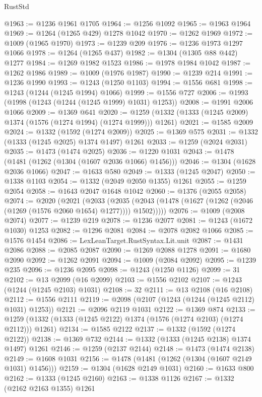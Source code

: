 \begin{lexlean}{RustStd}
\begin{coremodule}
@1963 := @1236 @1961 @1705
@1964 := @1256 @1092
@1965 := @1963 @1964
@1969 := @1264 (@1265 @429) @1278 @1042
@1970 := @1262 @1969
@1972 := @1009 (@1965 @1970)
@1973 := @1239 @209
@1976 := @1236 @1973 @1297 @1066
@1978 := @1264 (@1265 @437)
@1982 := @1304 (@1305 @88 @442) @1277
@1984 := @1269 @1982 @1523
@1986 := @1978 @1984 @1042
@1987 := @1262 @1986
@1989 := @1009 (@1976 @1987)
@1990 := @1239 @214
@1991 := @1236 @1990
@1993 := @1243 (@1250 @1103)
@1994 := @1556 @681
@1998 := @1243 (@1244 (@1245 @1994) @1066)
@1999 := @1556 @727
@2006 := @1993 (@1998 (@1243 (@1244 (@1245 @1999) @1031) @1253))
@2008 := @1991 @2006 @1066
@2009 := @1369 @641
@2020 := @1259 (@1332 (@1333 (@1245 @2009) @1374 (@1576 (@1274 @1994) (@1274 @1999))) @1261)
@2021 := @1585 @2009
@2024 := @1332 (@1592 (@1274 @2009))
@2025 := @1369 @575
@2031 := @1332 (@1333 (@1245 @2025) @1374 @1497) @1261
@2033 := @1259 (@2024 @2031)
@2035 := @1473 (@1474 @2025)
@2036 := @1220 @1031
@2043 := @1478 (@1481 (@1262 (@1304 (@1607 @2036 @1066) @1456)))
@2046 := @1304 (@1628 @2036 @1066)
@2047 := @1633 @580
@2049 := @1333 (@1245 @2047)
@2050 := @1338 @1103
@2054 := @1332 (@2049 @2050 @1355) @1261
@2055 := @1259 @2054
@2058 := @1643 @2047 @1648 @1042
@2060 := @1376 (@2055 @2058)
@2074 := @2020
    (@2021
      (@2033
        (@2035 (@2043 (@1478 (@1627 (@1262 (@2046 (@1269 (@1576 @2060 @1654) @1277)))) @1502)))))
@2076 := @1009 (@2008 @2074)
@2077 := @1239 @219
@2078 := @1236 @2077
@2081 := @1243 (@1672 @1030) @1253
@2082 := @1296 @2081
@2084 := @2078 @2082 @1066
@2085 := @1576 @1454
@2086 := LexLeanTarget.RustSyntax.Lit.unit
@2087 := @1431 @2086
@2088 := @2085 @2087
@2090 := @1269 @2088 @1278
@2091 := @1680 @2090
@2092 := @1262 @2091
@2094 := @1009 (@2084 @2092)
@2095 := @1239 @235
@2096 := @1236 @2095
@2098 := @1243 (@1250 @1126)
@2099 := 31
@2102 := @13 @2099 (@16 @2099)
@2103 := @1556 @2102
@2107 := @1243 (@1244 (@1245 @2103) @1031)
@2108 := 32
@2111 := @13 @2108 (@16 @2108)
@2112 := @1556 @2111
@2119 := @2098 (@2107 (@1243 (@1244 (@1245 @2112) @1031) @1253))
@2121 := @2096 @2119 @1031
@2122 := @1369 @874
@2133 := @1259 (@1332 (@1333 (@1245 @2122) @1374 (@1576 (@1274 @2103) (@1274 @2112))) @1261)
@2134 := @1585 @2122
@2137 := @1332 (@1592 (@1274 @2122))
@2138 := @1369 @732
@2144 := @1332 (@1333 (@1245 @2138) @1374 @1497) @1261
@2146 := @1259 (@2137 @2144)
@2148 := @1473 (@1474 @2138)
@2149 := @1608 @1031
@2156 := @1478 (@1481 (@1262 (@1304 (@1607 @2149 @1031) @1456)))
@2159 := @1304 (@1628 @2149 @1031)
@2160 := @1633 @800
@2162 := @1333 (@1245 @2160)
@2163 := @1338 @1126
@2167 := @1332 (@2162 @2163 @1355) @1261

\end{coremodule}
\end{lexlean}
